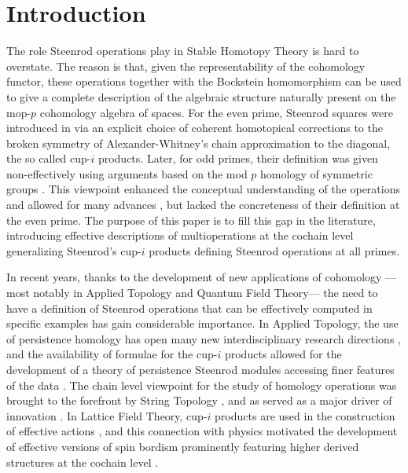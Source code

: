 
\section{Introduction} \label{s:introduction}

The role Steenrod operations play in Stable Homotopy Theory is hard to overstate.
The reason is that, given the representability of the cohomology functor, these operations together with the Bockstein homomorphism can be used to give a complete description of the algebraic structure naturally present on the mop-$p$ \mbox{cohomology} algebra of spaces.
For the even prime, Steenrod squares were introduced in \cite{steenrod47products} via an explicit choice of coherent homotopical corrections to the broken symmetry of Alexander-Whitney's chain approximation to the diagonal, the so called cup-$i$ products.
Later, for odd primes, their definition was given non-effectively using arguments based on the mod $p$ homology of symmetric groups \cites{steenrod53symmetric, steenrod53cyclic, steenrod62operations}.
This viewpoint enhanced the conceptual understanding of the operations and allowed for many advances \cites{adem1952iteration, milnor1958dual, adams1995stable}, but lacked the concreteness of their definition at the even prime.
The purpose of this paper is to fill this gap in the literature, introducing effective descriptions of multioperations at the cochain level generalizing Steenrod's cup-$i$ products defining Steenrod operations at all primes.

In recent years, thanks to the development of new applications of cohomology ---most notably in Applied Topology and Quantum Field Theory--- the need to have a definition of Steenrod operations that can be effectively computed in specific examples has gain considerable importance.
In Applied Topology, the use of persistence homology \cites{carlsson2009data, edelsbrunner2008persistent} has open many new interdisciplinary research directions \cites{de2007coverage,chan2013topology,lee2017quantifying}, and the availability of formulae for the cup-$i$ products allowed for the development of a theory of persistence Steenrod modules accessing finer features of the data \cite{medina2018persistence}.
The chain level viewpoint for the study of homology operations was brought to the forefront by String Topology \cite{Sullivanoverview}, and as served as a major driver of innovation \cites{TZ, hoch2}.
In Lattice Field Theory, cup-$i$ products are used in the construction of effective actions \cite{gaiotto2016spin, bhardwaj2017state, kapustin2017fermionic}, and this connection with physics motivated the development of effective versions of spin bordism \cites{brumfiel2016pontrjagin, brumfiel2018pontrjagin} prominently featuring higher derived structures at the cochain level \cite{medina2020cartan, medina2020adem}.

